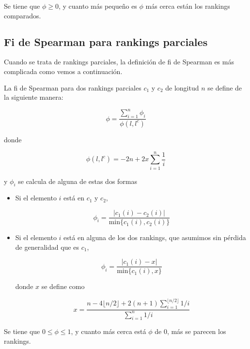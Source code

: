 Se tiene que $\phi \geq 0$, y cuanto más pequeño es $\phi$ más cerca están los rankings comparados. 

\subsection{Fi de Spearman para rankings parciales}

Cuando se trata de rankings parciales, la definición de fi de Spearman es más complicada como vemos a continuación.

\begin{defi}
La fi de Spearman para dos rankings parciales $c_1$ y $c_2$ de longitud $n$ se define de la siguiente manera:

\begin{equation}
\phi = \dfrac{\sum\limits_{i=1}^{n} \phi_i}{\phi(l, l^c)}
\end{equation} 

donde 

\begin{equation}
\phi(l, l^c) = -2n + 2x\sum\limits_{i=1}^{n} \dfrac{1}{i}
\end{equation}

y $\phi_i$ se calcula de alguna de estas dos formas

\begin{itemize}
\item Si el elemento $i$ está en $c_1$ y $c_2$,

\begin{equation}
\phi_i = \dfrac{|c_1(i) - c_2(i)|}{\mathrm{min}\{c_1(i), c_2(i)\}}
\end{equation}

\item Si el elemento $i$ está en alguna de los dos rankings, que asumimos sin pérdida de generalidad que es $c_1$,


\begin{equation}
\phi_i = \dfrac{|c_1(i) - x|}{\mathrm{min}\{c_1(i), x\}}
\end{equation} 

donde $x$ se define como

\begin{equation}
x = \dfrac{n - 4 \lfloor n/2\rfloor + 2(n+1) \sum_{i=1}^{\lfloor n/2\rfloor} 1/i}{\sum_{i=1}^{n} 1/i}
\end{equation}
\end{itemize}
\end{defi}

Se tiene que $0 \leq \phi \leq 1$, y cuanto más cerca está $\phi$ de $0$, más se parecen los rankings.


